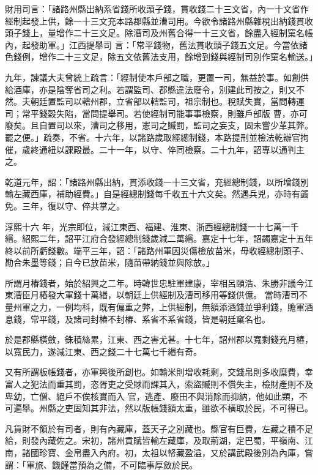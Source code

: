 \begin{pinyinscope}
 財用司言：「諸路州縣出納系省錢所收頭子錢，貫收錢二十三文省，內一十文省作經制起發上供，餘一十三文充本路郡縣並漕司用。今欲令諸路州縣雜稅出納錢貫收頭子錢上，量增作二十三文足。除漕司及州舊合得一十三文省，餘盡入經制窠名帳內，起發助軍。」江西提舉司
 言：「常平錢物，舊法貫收頭子錢五文足。今當依諸色錢例，增作二十三文足，除五文依舊法支用，餘增到錢與經制司別作窠名輸送。」



 九年，諫議大夫曾統上疏言：「經制使本戶部之職，更置一司，無益於事。如創供給酒庫，亦是陰奪省司之利。若謂監司、郡縣違法廢令，別建此司按之，則又不然。夫朝廷置監司以轄州郡，立省部以轄監司，祖宗制也。稅賦失實，當問轉運司；常平錢穀失陷，當問提舉司。若使經制司能事事檢察，則雖戶部版
 曹，亦可廢矣。且自置司以來，漕司之移用，憲司之贓罰，監司之妄支，固未嘗少革其弊。罷之便。」疏奏，不省。十六年，以諸路歲取經總制錢，本路提刑並檢法乾辦官拘催，歲終通紐以課殿最。二十一年，以守、倅同檢察。二十九年，詔專以通判主之。



 乾道元年，詔：「諸路州縣出納，貫添收錢一十三文省，充經總制錢，以所增錢別輸左藏西庫，補助經費。」自是經總制錢每千收五十六文矣。然遇兵兇，亦時有蠲免。三年，復以守、倅共掌之。



 淳熙十六
 年，光宗即位，減江東西、福建、淮東、浙西經總制錢一十七萬一千緡。紹熙二年，詔平江府合發經總制錢歲減二萬緡。嘉定十七年，詔蠲嘉定十五年終以前所虧錢數。端平三年，詔：「諸路州軍因災傷檢放苗米，毋收經總制頭子、勘合朱墨等錢；自今已放苗米，隨苗帶納錢並與除放。」



 所謂月樁錢者，始於紹興之二年。時韓世忠駐軍建康，宰相呂頤浩、朱勝非議今江東漕臣月樁發大軍錢十萬緡，以朝廷上供經制及漕司移用等錢供億。
 當時漕司不量州軍之力，一例均科，既有偏重之弊，上供經制，無額添酒錢並爭利錢，贍軍酒息錢，常平錢，及諸司封樁不封樁、系省不系省錢，皆是朝廷窠名也。



 於是郡縣橫斂，銖積絲累，江東、西之害尤甚。十七年，詔州郡以寬剩錢充月樁，以寬民力，遂減江東、西之錢二十七萬七千緡有奇。



 又有所謂板帳錢者，亦軍興後所創也。如輸米則增收耗剩，交錢帛則多收糜費，幸富人之犯法而重其罰，恣胥吏之受賕而課其入，索盜贓則不償失主，檢財產則不及卑幼，亡僧、絕戶不俟核實而入
 官，逃產、廢田不與消除而抑納，他如此類，不可遍舉。州縣之吏固知其非法，然以版帳錢額太重，雖欲不橫取於民，不可得已。



 凡貨財不領於有司者，則有內藏庫，蓋天子之別藏也。縣官有巨費，左藏之積不足給，則發內藏佐之。宋初，諸州貢賦皆輸左藏庫，及取荊湖，定巴蜀，平嶺南、江南，諸國珍寶、金帛盡入內府。初，太祖以帑藏盈溢，又於講武殿後別為內庫，嘗謂：「軍旅、饑饉當預為之備，不可臨事厚斂於民。




\end{pinyinscope}
